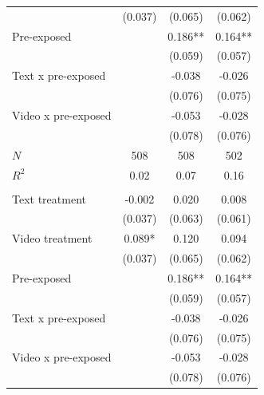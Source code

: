 \documentclass[
  11pt,
  oneside]{article}
\begin{document}
\begin{table}
\begin{threeparttable}
\begin{tabular}[t]{lccc}
\hspace{1em} & (0.037) & (0.065) & \vphantom{1} (0.062)\\
\hspace{1em}Pre-exposed &  & 0.186** & \vphantom{1} 0.164**\\
\hspace{1em} &  & (0.059) & \vphantom{1} (0.057)\\
\hspace{1em}Text x pre-exposed &  & -0.038 & \vphantom{1} -0.026\\
\hspace{1em} &  & (0.076) & \vphantom{1} (0.075)\\
\hspace{1em}Video x pre-exposed &  & -0.053 & \vphantom{1} -0.028\\
\hspace{1em} &  & (0.078) & \vphantom{1} (0.076)\\
\hspace{1em}$N$ & 508 & 508 & \vphantom{1} 502\\
\hspace{1em}$R^2$ & 0.02 & 0.07 & \vphantom{1} 0.16\\
\addlinespace[0.5em]
\multicolumn{4}{l}{\textit{Outcome: recommend employer}}\\
\midrule \hspace{1em}Text treatment & -0.002 & 0.020 & 0.008\\
\hspace{1em} & (0.037) & (0.063) & (0.061)\\
\hspace{1em}Video treatment & 0.089* & 0.120 & 0.094\\
\hspace{1em} & (0.037) & (0.065) & (0.062)\\
\hspace{1em}Pre-exposed &  & 0.186** & 0.164**\\
\hspace{1em} &  & (0.059) & (0.057)\\
\hspace{1em}Text x pre-exposed &  & -0.038 & -0.026\\
\hspace{1em} &  & (0.076) & (0.075)\\
\hspace{1em}Video x pre-exposed &  & -0.053 & -0.028\\
\hspace{1em} &  & (0.078) & (0.076)\\

\end{tabular}
\end{threeparttable}
\end{table}
\end{document}

